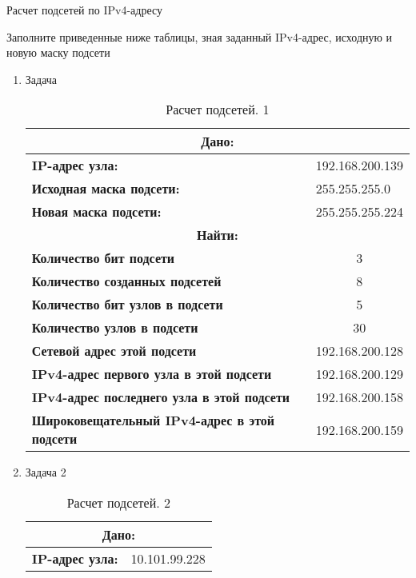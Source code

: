 \documentclass[a4paper,14pt]{extarticle}
\begin{document}
\begin{mypart}{Расчет подсетей по IPv4-адресу}
	
	\begin{step}{Заполните приведенные ниже таблицы, зная заданный IPv4-адрес, исходную и
			новую маску подсети}
		\begin{enumerate}
			\item Задача
	
		
\begin{table}[h!]
		\caption{Расчет подсетей. 1}
		\centering
		\begin{tabular}{|l|l|}
			\hline
			\multicolumn{2}{|c|}{\textbf{Дано:}}  \\ \hline
			\multicolumn{ 1}{|l|}{\textbf{IP-адрес узла:}} & 192.168.200.139 \\ \hline
			\textbf{Исходная маска подсети:} & 255.255.255.0 \\ \hline
			\textbf{Новая маска подсети:} & 255.255.255.224 \\ \hline
			\multicolumn{2}{|c|}{\textbf{Найти:}}  \\ \hline
			\multicolumn{ 1}{|l|}{\textbf{Количество бит подсети}} & \multicolumn{1}{c|}{3}\\  \hline
			\textbf{Количество созданных подсетей} & \multicolumn{1}{c|}{8} \\ \hline
			\textbf{Количество бит узлов в подсети} & \multicolumn{1}{c|}{5} \\ \hline
			\textbf{Количество узлов в подсети} & \multicolumn{1}{c|}{30} \\ \hline
			\textbf{Сетевой адрес этой подсети} & 192.168.200.128 \\ \hline
			\textbf{IPv4-адрес первого узла в этой подсети} & 192.168.200.129 \\ \hline
			\textbf{IPv4-адрес последнего узла в этой подсети} & 192.168.200.158 \\ \hline
			\textbf{Широковещательный IPv4-адрес в этой подсети} & 192.168.200.159 \\ \hline
		\end{tabular}
		\label{}
	\end{table}
\newpage
\item Задача 2
\begin{table}[h!]
		\centering
		\caption{Расчет подсетей. 2}
	\begin{tabular}{|l|l|}
		\hline
			\multicolumn{2}{|c|}{\textbf{Дано:}}  \\ \hline
		\textbf{IP-адрес узла:} & 10.101.99.228 \\ \hline

\end{tabular}
\end{table}
\end{enumerate}
\end{step}
\end{mypart}
\end{document}
